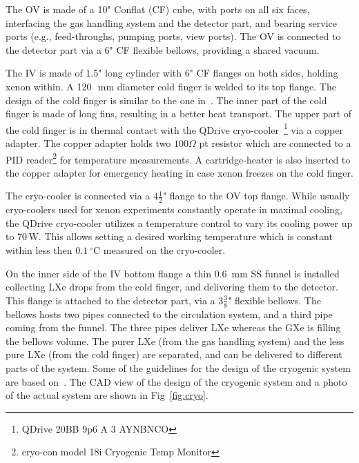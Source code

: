 The OV is made of a 10" Conflat (CF) cube, with ports on all six faces, interfacing the gas handling system and  the detector part, and bearing service ports (e.g., feed-throughs, pumping ports, 
view ports). The OV is connected to the detector part via a 6" CF flexible bellows, providing a shared vacuum.

The IV is made of 1.5" long cylinder with 6" CF flanges on both sides, holding xenon within. A 120~\,mm diameter cold finger is welded to its top flange. The design of the cold finger is similar to the one in~\cite{xe100_instr2012}. The inner part of the cold finger is made of long fins, resulting in a better heat transport.  The upper part of the cold finger is in thermal contact with the 
QDrive cryo-cooler~\footnote{QDrive 20BB 9p6 A 3 AYNBNCO} via a copper adapter. The copper adapter 
holds two $100\Omega$ pt resistor which are connected to a PID reader\footnote{cryo-con model 
18i Cryogenic Temp Monitor} for temperature measurements. A cartridge-heater 
is also inserted to the copper adapter for emergency heating in case xenon freezes on the 
cold finger. 

The cryo-cooler is connected via a $4\frac{1}{2}$" 
flange to the OV top flange. While usually cryo-coolers used for 
xenon experiments constantly operate in maximal cooling, the QDrive cryo-cooler utilizes a 
temperature control to vary its cooling power up to 70\,W. This allows setting a desired working temperature which is constant within less then $0.1~\mathrm{^{\circ}C}$ measured on the cryo-cooler.

On the inner side of the IV bottom flange a thin 0.6~mm SS funnel is installed 
collecting LXe drops from the cold finger, and delivering them to the  detector. This flange is attached to the detector part, via a $3\frac{3}{8}$" flexible bellows. The 
bellows hosts two pipes connected to the circulation system, and a third pipe coming 
from the funnel. The three pipes deliver LXe whereas the GXe is filling the bellows volume. The purer LXe (from the gas handling system) and the less pure LXe (from the cold finger) are separated, and can be delivered to different parts of the system. Some of the guidelines for the design of 
the cryogenic system are based on~\cite{Giboni}. The CAD view of 
the design of the cryogenic system and a photo of the actual system are shown in Fig~\ref{fig:cryo}. 

